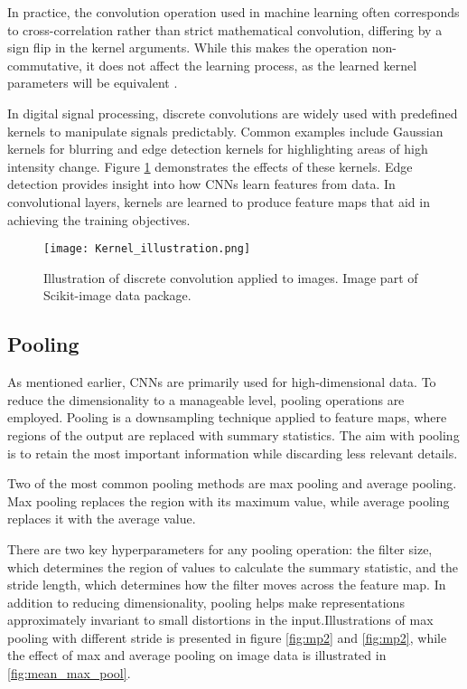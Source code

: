 \documentclass[../../thesis.tex]{subfiles}
\begin{document}
In practice, the convolution operation used in machine learning often corresponds to cross-correlation rather than strict mathematical convolution, differing by a sign flip in the kernel arguments. While this makes the operation non-commutative, it does not affect the learning process, as the learned kernel parameters will be equivalent \cite{deeplearningbook}.\newline


In digital signal processing, discrete convolutions are widely used with predefined kernels to manipulate signals predictably. Common examples include Gaussian kernels for blurring and edge detection kernels for highlighting areas of high intensity change. Figure \ref{fig:kernelIllustration} demonstrates the effects of these kernels. Edge detection provides insight into how CNNs learn features from data. In convolutional layers, kernels are learned to produce feature maps that aid in achieving the training objectives.
\begin{figure}[h]
    \centering
    \texttt{[image: Kernel\_illustration.png]}
    \caption{Illustration of discrete convolution applied to images. Image part of Scikit-image data package.}
    \label{fig:kernelIllustration}
\end{figure}

\subsection{Pooling}
As mentioned earlier, CNNs are primarily used for high-dimensional data. To reduce the dimensionality to a manageable level, pooling operations are employed. Pooling is a downsampling technique applied to feature maps, where regions of the output are replaced with summary statistics. The aim with pooling is to retain the most important information while discarding less relevant details.

Two of the most common pooling methods are max pooling and average pooling. Max pooling replaces the region with its maximum value, while average pooling replaces it with the average value.\newline

There are two key hyperparameters for any pooling operation: the filter size, which determines the region of values to calculate the summary statistic, and the stride length, which determines how the filter moves across the feature map. In addition to reducing dimensionality, pooling helps make representations approximately invariant to small distortions in the input.Illustrations of max pooling with different stride is presented in figure \ref{fig:mp2} and \ref{fig:mp2}, while the effect of max and average pooling on image data is illustrated in \ref{fig:mean_max_pool}.\newline
\end{document}
